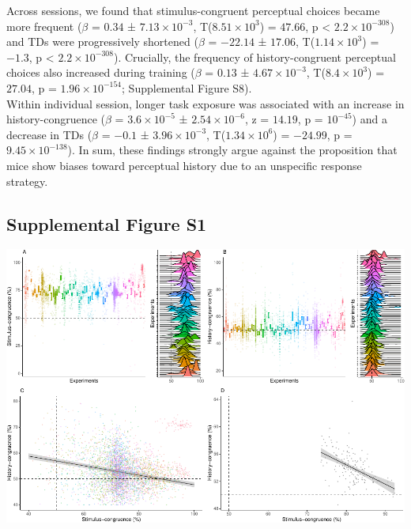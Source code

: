 \documentclass[
]{article}
\begin{document}
Across sessions, we found that stimulus-congruent perceptual choices
became more frequent (\(\beta\) = \(0.34\) ±
\(\ensuremath{7.13\times 10^{-3}}\),
T(\(\ensuremath{8.51\times 10^{3}}\)) = \(47.66\), p < \(\ensuremath{2.2\times 10^{-308}}\)) and TDs
were progressively shortened (\(\beta\) = \(-22.14\) ± \(17.06\),
T(\(\ensuremath{1.14\times 10^{3}}\)) = \(-1.3\), p < \(\ensuremath{2.2\times 10^{-308}}\)). Crucially,
the frequency of history-congruent perceptual choices also increased
during training (\(\beta\) = \(0.13\) ±
\(\ensuremath{4.67\times 10^{-3}}\),
T(\(\ensuremath{8.4\times 10^{3}}\)) = \(27.04\), p =
\(\ensuremath{1.96\times 10^{-154}}\); Supplemental Figure S8).\\
Within individual session, longer task exposure was associated with an
increase in history-congruence (\(\beta\) =
\(\ensuremath{3.6\times 10^{-5}}\) ±
\(\ensuremath{2.54\times 10^{-6}}\), z = \(14.19\), p =
\(\ensuremath{10^{-45}}\)) and a decrease in TDs (\(\beta\) = \(-0.1\) ±
\(\ensuremath{3.96\times 10^{-3}}\),
T(\(\ensuremath{1.34\times 10^{6}}\)) = \(-24.99\), p =
\(\ensuremath{9.45\times 10^{-138}}\)). In sum, these findings strongly
argue against the proposition that mice show biases toward perceptual
history due to an unspecific response strategy.

\newpage

\hypertarget{supplemental-figure-s1}{%
\subsection{Supplemental Figure S1}\label{supplemental-figure-s1}}

\includegraphics{modes_mouse_rev1b_files/figure-latex/Supplememtal_Figure_S1-1.pdf}
\end{document}

